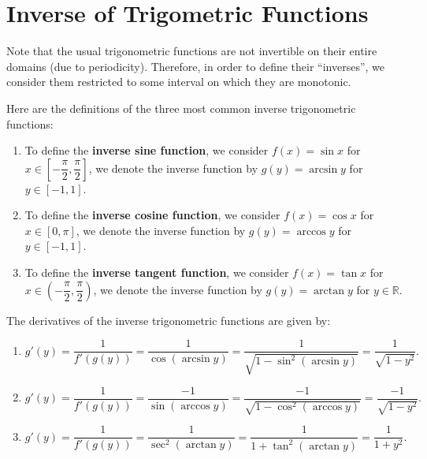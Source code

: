     \section{Inverse of Trigometric Functions}
    Note that the usual trigonometric functions are not invertible on their entire domains (due to periodicity). Therefore, in order to define their ``inverses'', we consider them restricted to some interval on which they are monotonic.
    \begin{definitionenv}
        Here are the definitions of the three most common inverse trigonometric functions:
        \begin{enumerate}
            \item To define the \textbf{inverse sine function}, we consider $f(x)=\sin x$ for $x \in \left[-\dfrac{\pi}{2}, \dfrac{\pi}{2}\right]$, we denote the inverse function by $g(y)=\arcsin y$ for $y \in [-1,1]$.
            \item To define the \textbf{inverse cosine function}, we consider $f(x)=\cos x$ for $x \in [0, \pi]$, we denote the inverse function by $g(y)=\arccos y$ for $y \in [-1,1]$.
            \item To define the \textbf{inverse tangent function}, we consider $f(x)=\tan x$ for $x \in \left(-\dfrac{\pi}{2}, \dfrac{\pi}{2}\right)$, we denote the inverse function by $g(y)=\arctan y$ for $y \in \mathbb{R}$.
        \end{enumerate}
    \end{definitionenv}
    \begin{theoremenv}
        The derivatives of the inverse trigonometric functions are given by:
        \begin{enumerate}
            \item [(1)]
            \[
            g'(y) = \dfrac{1}{f'(g(y))} = \frac{1}{\cos(\arcsin y)} = \frac{1}{\sqrt{1-\sin^2(\arcsin y)}} = \frac{1}{\sqrt{1-y^2}}.
            \]
            \item [(2)]
            \[
            g'(y) = \dfrac{1}{f'(g(y))} = \frac{-1}{\sin(\arccos y)} = \frac{-1}{\sqrt{1-\cos^2(\arccos y)}} = \frac{-1}{\sqrt{1-y^2}}.
            \]
            \item [(3)]
            \[
            g'(y) = \dfrac{1}{f'(g(y))} = \frac{1}{\sec^2(\arctan y)} = \frac{1}{1+\tan^2(\arctan y)} = \frac{1}{1+y^2}.
            \]
        \end{enumerate}
    \end{theoremenv}
